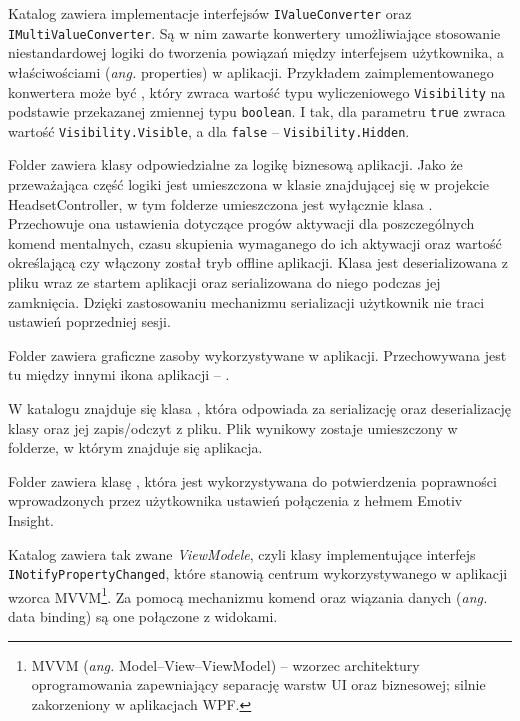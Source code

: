 \documentclass[skorowidz,skroty]{dyplomWEZUT}
\begin{document}
Katalog  zawiera implementacje interfejsów \lstinline[language={[Sharp]C}]{IValueConverter} oraz \linebreak \lstinline[language={[Sharp]C}]{IMultiValueConverter}. Są w nim zawarte konwertery umożliwiające stosowanie niestandardowej logiki do tworzenia powiązań między interfejsem użytkownika, a właściwościami (\textit{ang.} properties) w aplikacji. Przykładem zaimplementowanego konwertera może być , który zwraca wartość typu wyliczeniowego \lstinline[language={[Sharp]C}]{Visibility} na podstawie przekazanej zmiennej typu \lstinline[language={[Sharp]C}]{boolean}. I tak, dla parametru \lstinline[language={[Sharp]C}]{true} zwraca wartość \lstinline[language={[Sharp]C}]{Visibility.Visible}, a dla \lstinline[language={[Sharp]C}]{false} -- \lstinline[language={[Sharp]C}]{Visibility.Hidden}.

Folder  zawiera klasy odpowiedzialne za logikę biznesową aplikacji. Jako że przeważająca część logiki jest umieszczona w klasie  znajdującej się w projekcie HeadsetController, w tym folderze umieszczona jest wyłącznie klasa . Przechowuje ona ustawienia dotyczące progów aktywacji dla poszczególnych komend mentalnych, czasu skupienia wymaganego do ich aktywacji oraz wartość określającą czy włączony został tryb offline aplikacji. Klasa jest deserializowana z pliku  wraz ze startem aplikacji oraz serializowana do niego podczas jej zamknięcia. Dzięki zastosowaniu mechanizmu serializacji użytkownik nie traci ustawień poprzedniej sesji.

Folder  zawiera graficzne zasoby wykorzystywane w aplikacji. Przechowywana jest tu między innymi ikona aplikacji -- .

W katalogu  znajduje się klasa , która odpowiada za serializację oraz deserializację klasy  oraz jej zapis/odczyt z pliku. Plik wynikowy  zostaje umieszczony w folderze, w którym znajduje się aplikacja.

Folder  zawiera klasę , która jest wykorzystywana do potwierdzenia poprawności wprowadzonych przez użytkownika ustawień połączenia z hełmem Emotiv Insight.

Katalog  zawiera tak zwane \textit{ViewModele}, czyli klasy implementujące interfejs \lstinline[language={[Sharp]C}]{INotifyPropertyChanged}, które stanowią centrum wykorzystywanego w aplikacji wzorca MVVM\footnote{MVVM (\textit{ang.} Model--View--ViewModel) -- wzorzec architektury oprogramowania zapewniający separację warstw UI oraz biznesowej; silnie zakorzeniony w aplikacjach WPF.}. Za pomocą mechanizmu komend oraz wiązania danych (\textit{ang.} data binding) są one połączone z widokami.
\end{document}
